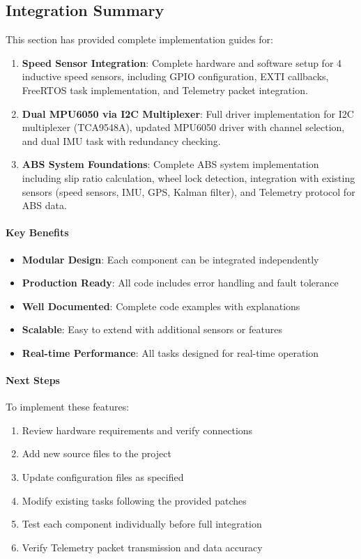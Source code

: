 \documentclass[11pt,a4paper]{article}
\begin{document}
\subsection{Integration Summary}

This section has provided complete implementation guides for:

\begin{enumerate}
    \item \textbf{Speed Sensor Integration}: Complete hardware and software setup for 4 inductive speed sensors, including GPIO configuration, EXTI callbacks, FreeRTOS task implementation, and Telemetry packet integration.
    
    \item \textbf{Dual MPU6050 via I2C Multiplexer}: Full driver implementation for I2C multiplexer (TCA9548A), updated MPU6050 driver with channel selection, and dual IMU task with redundancy checking.
    
    \item \textbf{ABS System Foundations}: Complete ABS system implementation including slip ratio calculation, wheel lock detection, integration with existing sensors (speed sensors, IMU, GPS, Kalman filter), and Telemetry protocol for ABS data.
\end{enumerate}

\paragraph{Key Benefits}
\begin{itemize}
    \item \textbf{Modular Design}: Each component can be integrated independently
    \item \textbf{Production Ready}: All code includes error handling and fault tolerance
    \item \textbf{Well Documented}: Complete code examples with explanations
    \item \textbf{Scalable}: Easy to extend with additional sensors or features
    \item \textbf{Real-time Performance}: All tasks designed for real-time operation
\end{itemize}

\paragraph{Next Steps}
To implement these features:
\begin{enumerate}
    \item Review hardware requirements and verify connections
    \item Add new source files to the project
    \item Update configuration files as specified
    \item Modify existing tasks following the provided patches
    \item Test each component individually before full integration
    \item Verify Telemetry packet transmission and data accuracy
\end{enumerate}
\end{document}
